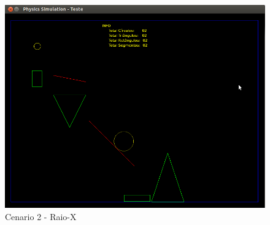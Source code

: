   \begin{figure}[H]
	  \centering
    \includegraphics[scale=0.4]{images/cenario-todosE.png}
	  \caption{Cenario 2 - Raio-X}
  \end{figure}

